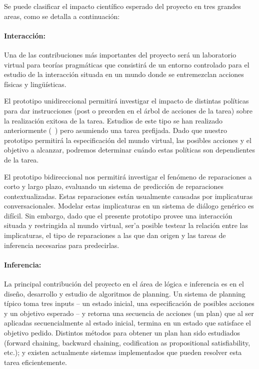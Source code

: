 
Se puede clasificar el impacto cient\'ifico
esperado del proyecto en tres grandes areas, como se detalla a continuaci\'on:

\paragraph{Interacci\'on:}
Una de las contribuciones m\'as
importantes del proyecto ser\'a un laboratorio virtual para
teor\'ias pragm\'aticas que consistir\'a de un
entorno controlado para el estudio de la interacci\'on situada en un mundo donde
se entremezclan acciones f\'isicas y ling\"u\'isticas. 

El prototipo unidireccional permitir\'a
investigar el impacto de distintas
pol\'iticas para dar instrucciones (post o
preorden en el \'arbol de acciones de la tarea)
sobre la realizaci\'on exitosa de la tarea.
Estudios de este tipo se han realizado anteriormente
(~\citep{foster-etal-ijcai2009}) pero 
asumiendo una tarea prefijada.
Dado que nuestro prototipo permitir\'a la especificaci\'on
del mundo virtual, las posibles acciones y el objetivo
a alcanzar, podremos determinar cu\'ando estas pol\'iticas
son dependientes de la tarea.

El prototipo bidireccional nos permitir\'a investigar el
fen\'omeno de reparaciones a corto y largo plazo,
evaluando un sistema de predicci\'on de reparaciones
contextualizadas.  Estas reparaciones est\'an usualmente
causadas por implicaturas conversacionales.  Modelar
estas implicaturas en un sistema de di\'alogo gen\'erico
es dif\'icil.  Sin embargo, dado que el presente prototipo provee una
interacci\'on situada
y restringida al mundo virtual, ser'a posible testear la relaci\'on entre
las implicaturas, el tipo de reparaciones a las que
dan origen y las tareas de inferencia necesarias para
predecirlas.

\paragraph{Inferencia:} La principal contribuci\'on del
proyecto en el \'area de l\'ogica e inferencia es en el
dise\~no, desarrollo y estudio de algoritmos de planning.
Un sistema de planning t\'ipico toma tres inputs -- un
estado inicial, una especificaci\'on de posibles acciones y
un objetivo esperado -- y retorna una secuencia de acciones (un plan)
que al ser aplicadas secuencialmente al estado inicial, termina
en un estado que satisface el objetivo pedido.  Distintos
m\'etodos para obtener un plan han sido estudiados (forward chaining, backward
chaining, codification as propositional
satisfiability, etc.); y existen actualmente sistemas
implementados que pueden resolver esta tarea eficientemente.

